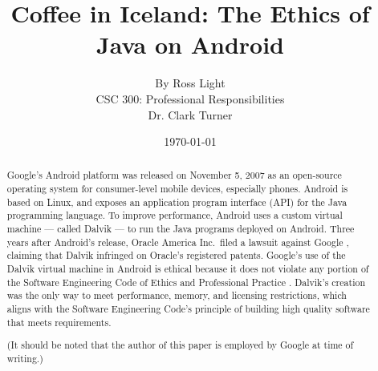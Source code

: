 \documentclass[11pt]{article}
\begin{document}
\title{\vfill Coffee in Iceland: The Ethics of Java on Android} %
\author{
By Ross Light \vspace{10pt} \\
CSC 300: Professional Responsibilities  \vspace{10pt} \\
Dr. Clark Turner \vspace{10pt} \\
}
\date{\today} %

\maketitle

\vfill  %
\begin{abstract} %
Google's Android platform was released on November 5, 2007
\cite{open-handset-alliance-ann} as an open-source operating system for
consumer-level mobile devices, especially phones.  Android is based on Linux,
and exposes an application program interface (API) for the Java programming
language.  To improve performance, Android uses a custom virtual machine ---
called Dalvik --- to run the Java programs deployed on Android.  Three years
after Android's release, Oracle America Inc.~filed a lawsuit against Google
\cite{oracle-lawsuit}, claiming that Dalvik infringed on Oracle's registered
patents.  Google's use of the Dalvik virtual machine in Android is ethical
because it does not violate any portion of the Software Engineering Code of
Ethics and Professional Practice \cite{secode}.  Dalvik's creation was the only
way to meet performance, memory, and licensing restrictions, which aligns with
the Software Engineering Code's principle of building high quality software that
meets requirements.

(It should be noted that the author of this paper is employed by Google at
time of writing.)
\end{abstract} %

\thispagestyle{empty} %
\newpage

\thispagestyle{empty}  %
\tableofcontents
\end{document}
